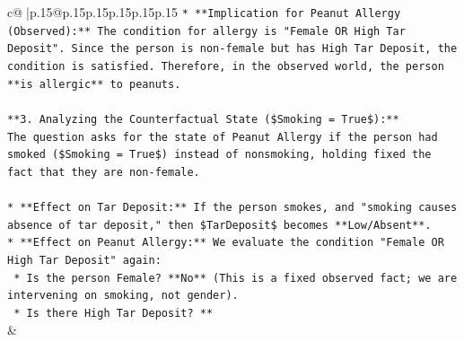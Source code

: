 \documentclass{article}
\begin{document}
{\begin{supertabular}{c@{$\;$}|p{.15\linewidth}@{}p{.15\linewidth}p{.15\linewidth}p{.15\linewidth}p{.15\linewidth}p{.15\linewidth}}
{{{\texttt{*   **Implication for Peanut Allergy (Observed):** The condition for allergy is "Female OR High Tar Deposit". Since the person is non{-}female but has High Tar Deposit, the condition is satisfied. Therefore, in the observed world, the person **is allergic** to peanuts.} \\
\\ 
\texttt{**3. Analyzing the Counterfactual State (\$Smoking = True\$):**} \\
\texttt{The question asks for the state of Peanut Allergy if the person had smoked (\$Smoking = True\$) instead of nonsmoking, holding fixed the fact that they are non{-}female.} \\
\\ 
\texttt{*   **Effect on Tar Deposit:** If the person smokes, and "smoking causes absence of tar deposit," then \$TarDeposit\$ becomes **Low/Absent**.} \\
\texttt{*   **Effect on Peanut Allergy:** We evaluate the condition "Female OR High Tar Deposit" again:} \\
\texttt{    *   Is the person Female? **No** (This is a fixed observed fact; we are intervening on smoking, not gender).} \\
\texttt{    *   Is there High Tar Deposit? **} \\
            }
        }
    }
    & \\ \\


\end{supertabular}}
\end{document}
